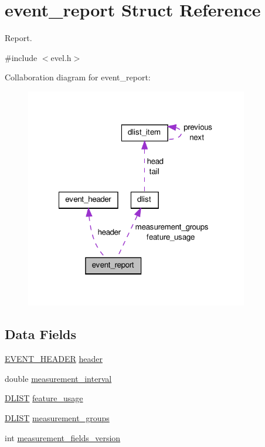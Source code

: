 \hypertarget{structevent__report}{}\section{event\+\_\+report Struct Reference}
\label{structevent__report}


Report.  




{\ttfamily \#include $<$evel.\+h$>$}



Collaboration diagram for event\+\_\+report\+:
\nopagebreak
\begin{figure}[H]
\begin{center}
\leavevmode
\includegraphics[width=276pt]{structevent__report__coll__graph}
\end{center}
\end{figure}
\subsection*{Data Fields}
\begin{DoxyCompactItemize}
\item 
\hyperlink{evel_8h_aa0ea94c675729365ea7825c4fc7e06d8}{E\+V\+E\+N\+T\+\_\+\+H\+E\+A\+D\+E\+R} \hyperlink{structevent__report_a7f9683ffdfa96c3c82913f7f60e95abb}{header}
\item 
double \hyperlink{structevent__report_add26cd9f3bbc2c88cd0ff774bfa3c9cd}{measurement\+\_\+interval}
\item 
\hyperlink{double__list_8h_a45f4a129042d9e1aa4ffd31fe13e4d14}{D\+L\+I\+S\+T} \hyperlink{structevent__report_abb6a555e0bf695531258a22286826cc2}{feature\+\_\+usage}
\item 
\hyperlink{double__list_8h_a45f4a129042d9e1aa4ffd31fe13e4d14}{D\+L\+I\+S\+T} \hyperlink{structevent__report_a1b6ed94783d22c55051a4d52eebb7686}{measurement\+\_\+groups}
\item 
int \hyperlink{structevent__report_abeb856adaab0580ff115ed65dd8839a9}{measurement\+\_\+fields\+\_\+version}
\end{DoxyCompactItemize}



